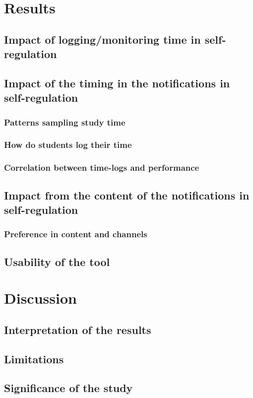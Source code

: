 \section{Results}

\subsection{Impact of logging/monitoring time in self-regulation}

\subsection{Impact of the timing in the notifications in self-regulation}


\subsubsection{Patterns sampling study time}

\subsubsection{How do students log their time}

\subsubsection{Correlation between time-logs and performance}


\subsection{Impact from the content of the notifications in self-regulation}


\subsubsection{Preference in content and channels}


\subsection{Usability of the tool}



\section{Discussion}


\subsection{Interpretation of the results}

\subsection{Limitations}


\subsection{Significance of the study}

